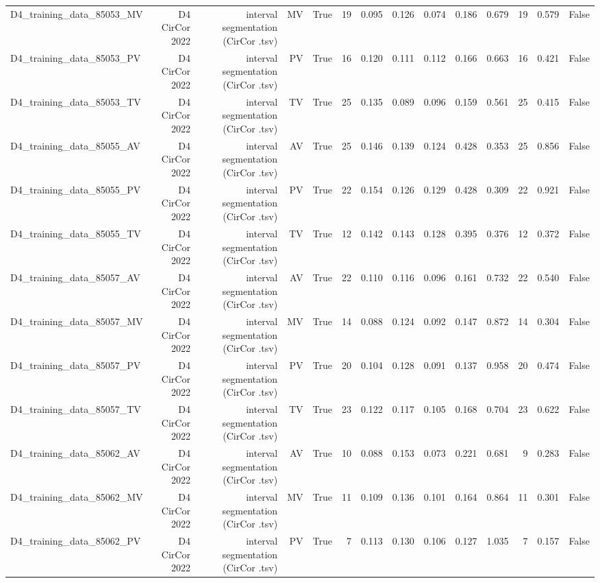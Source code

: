 \begin{table}[htbp]
\begin{tabular}{lrrrrrrrrrrrrr}
    D4\_training\_data\_85053\_MV & D4 CirCor 2022 & interval segmentation (CirCor .tsv) & MV & True & 19 & 0.095 & 0.126 & 0.074 & 0.186 & 0.679 & 19 & 0.579 & False \\
    D4\_training\_data\_85053\_PV & D4 CirCor 2022 & interval segmentation (CirCor .tsv) & PV & True & 16 & 0.120 & 0.111 & 0.112 & 0.166 & 0.663 & 16 & 0.421 & False \\
    D4\_training\_data\_85053\_TV & D4 CirCor 2022 & interval segmentation (CirCor .tsv) & TV & True & 25 & 0.135 & 0.089 & 0.096 & 0.159 & 0.561 & 25 & 0.415 & False \\
    D4\_training\_data\_85055\_AV & D4 CirCor 2022 & interval segmentation (CirCor .tsv) & AV & True & 25 & 0.146 & 0.139 & 0.124 & 0.428 & 0.353 & 25 & 0.856 & False \\
    D4\_training\_data\_85055\_PV & D4 CirCor 2022 & interval segmentation (CirCor .tsv) & PV & True & 22 & 0.154 & 0.126 & 0.129 & 0.428 & 0.309 & 22 & 0.921 & False \\
    D4\_training\_data\_85055\_TV & D4 CirCor 2022 & interval segmentation (CirCor .tsv) & TV & True & 12 & 0.142 & 0.143 & 0.128 & 0.395 & 0.376 & 12 & 0.372 & False \\
    D4\_training\_data\_85057\_AV & D4 CirCor 2022 & interval segmentation (CirCor .tsv) & AV & True & 22 & 0.110 & 0.116 & 0.096 & 0.161 & 0.732 & 22 & 0.540 & False \\
    D4\_training\_data\_85057\_MV & D4 CirCor 2022 & interval segmentation (CirCor .tsv) & MV & True & 14 & 0.088 & 0.124 & 0.092 & 0.147 & 0.872 & 14 & 0.304 & False \\
    D4\_training\_data\_85057\_PV & D4 CirCor 2022 & interval segmentation (CirCor .tsv) & PV & True & 20 & 0.104 & 0.128 & 0.091 & 0.137 & 0.958 & 20 & 0.474 & False \\
    D4\_training\_data\_85057\_TV & D4 CirCor 2022 & interval segmentation (CirCor .tsv) & TV & True & 23 & 0.122 & 0.117 & 0.105 & 0.168 & 0.704 & 23 & 0.622 & False \\
    D4\_training\_data\_85062\_AV & D4 CirCor 2022 & interval segmentation (CirCor .tsv) & AV & True & 10 & 0.088 & 0.153 & 0.073 & 0.221 & 0.681 & 9 & 0.283 & False \\
    D4\_training\_data\_85062\_MV & D4 CirCor 2022 & interval segmentation (CirCor .tsv) & MV & True & 11 & 0.109 & 0.136 & 0.101 & 0.164 & 0.864 & 11 & 0.301 & False \\
    D4\_training\_data\_85062\_PV & D4 CirCor 2022 & interval segmentation (CirCor .tsv) & PV & True & 7 & 0.113 & 0.130 & 0.106 & 0.127 & 1.035 & 7 & 0.157 & False \\

\end{tabular}
\end{table}
